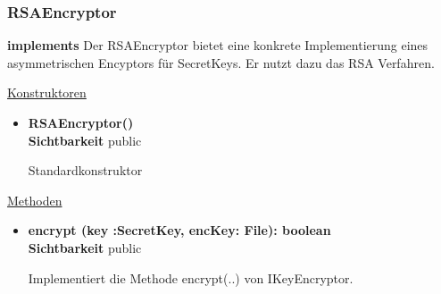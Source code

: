 \subsubsection{RSAEncryptor} \label{app:klasse:RSAEncryptor}
\textbf{implements}  \newline
Der RSAEncryptor bietet eine konkrete Implementierung eines asymmetrischen Encyptors für SecretKeys. Er nutzt dazu das RSA Verfahren. \newline

\underline{Konstruktoren}
\begin{itemize}
\itemsep0pt
\item \textbf{RSAEncryptor()} \hfill\\
\textbf{Sichtbarkeit} public

Standardkonstruktor
\end{itemize}

\underline{Methoden}
\begin{itemize}
\itemsep0pt
\item \textbf{encrypt (key :SecretKey, encKey: File): boolean}\hfill\\
\textbf{Sichtbarkeit} public

Implementiert die Methode encrypt(..) von IKeyEncryptor.

\end{itemize}